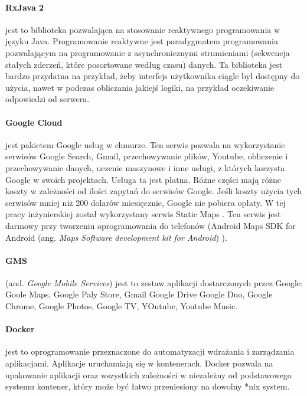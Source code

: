 \paragraph{RxJava 2} jest to biblioteka pozwalająca na stosowanie reaktywnego programowania w języku Java. Programowanie reaktywne jest paradygmatem programowania pozwalającym na programowanie z asynchronicznymi strumieniami (sekwencja stałych zderzeń, które posortowane według czasu) danych.
Ta biblioteka jest bardzo przydatna na przykład, żeby interfejs użytkownika ciągle był dostępny do użycia, nawet w podczas obliczania jakiejś logiki, na przykład oczekiwanie odpowiedzi od serwera.

\paragraph{Google Cloud} \cite{google_cloud} jest pakietem Google usług w chmurze. Ten serwis pozwala na wykorzystanie serwisów Google Search, Gmail, przechowywanie plików, Youtube, obliczenie i przechowywanie danych, uczenie maszynowe i inne usługi, z których korzysta Google w swoich projektach.
Usługa ta jest płatna. Różne części mają różne koszty w zależności od ilości zapytań do serwisów Google. Jeśli koszty użycia tych serwisów mniej niż 200 dolarów miesięcznie, Google nie pobiera opłaty. W tej pracy inżynierskiej został wykorzystany serwis Static Maps \cite{google_cloud_pricing}.
Ten serwis jest darmowy przy tworzeniu oprogramowania do telefonów (Android Maps SDK for Android (ang. \textit{Maps Software development kit for Android}) \cite{maps_sdk}).

\paragraph{GMS}  (and. \textit{Google Mobile Services}) jest to zestaw aplikacji dostarczonych przez Google: Goole Maps, Google Paly Store, Gmail Google Drive Google Duo, Google Chrome, Google Photos, Google TV, YOutube, Youtube Music.

\paragraph{Docker} \cite{docker,docker_doc} jest to oprogramowanie przeznaczone do automatyzacji wdrażania i zarządzania aplikacjami. Aplikacje uruchamiają się w kontenerach. Docker pozwala na upakowanie aplikacji oraz wszystkich zależności w niezależny od podstawowego systemu kontener, który może być łatwo przeniesiony na dowolny *nix system.

